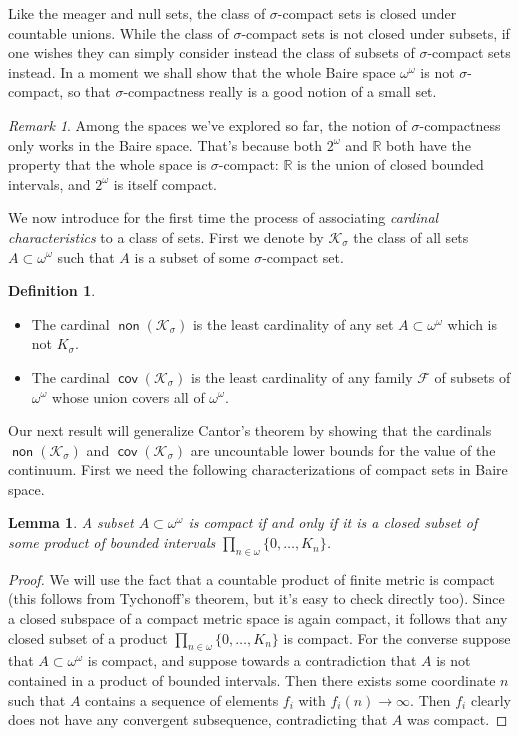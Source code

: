 \documentclass[11pt,oneside]{amsbook}
\newcommand{\RR}{\mathbb R}
\newcommand{\Ksigma}{\mathcal K_\sigma}
\DeclareMathOperator{\non}{\mathsf{non}}
\DeclareMathOperator{\cov}{\mathsf{cov}}
\theoremstyle{definition}
\theoremstyle{plain}
\newtheorem{lem}[thm]{Lemma}
\theoremstyle{definition}
\newtheorem{defn}[thm]{Definition}
\theoremstyle{remark}
\newtheorem{rem}[thm]{Remark}
\numberwithin{equation}{section}
\numberwithin{figure}{section}
\begin{document}
Like the meager and null sets, the class of $\sigma$-compact sets is closed under countable unions. While the class of $\sigma$-compact sets is not closed under subsets, if one wishes they can simply consider instead the class of subsets of $\sigma$-compact sets instead. In a moment we shall show that the whole Baire space $\omega^\omega$ is not $\sigma$-compact, so that $\sigma$-compactness really is a good notion of a small set.

\begin{rem}
  Among the spaces we've explored so far, the notion of $\sigma$-compactness only works in the Baire space. That's because both $2^\omega$ and $\RR$ both have the property that the whole space is $\sigma$-compact: $\RR$ is the union of closed bounded intervals, and $2^\omega$ is itself compact.
\end{rem}

We now introduce for the first time the process of associating \emph{cardinal characteristics} to a class of sets. First we denote by $\Ksigma$ the class of all sets $A\subset\omega^\omega$ such that $A$ is a subset of some $\sigma$-compact set.

\begin{defn}
  \begin{itemize}
  \item The cardinal $\non(\Ksigma)$ is the least cardinality of any set $A\subset\omega^\omega$ which is not $K_\sigma$.
  \item The cardinal $\cov(\Ksigma)$ is the least cardinality of any family $\mathcal F$ of subsets of $\omega^\omega$ whose union covers all of $\omega^\omega$.
  \end{itemize}
\end{defn}

Our next result will generalize Cantor's theorem by showing that the cardinals $\non(\Ksigma)$ and $\cov(\Ksigma)$ are uncountable lower bounds for the value of the continuum. First we need the following characterizations of compact sets in Baire space.

\begin{lem}
  \label{lem:baire-compact}
  A subset $A\subset\omega^\omega$ is compact if and only if it is a closed subset of some product of bounded intervals $\prod_{n\in\omega}\{0,\ldots,K_n\}$.
\end{lem}

\begin{proof}
  We will use the fact that a countable product of finite metric is compact (this follows from Tychonoff's theorem, but it's easy to check directly too). Since a closed subspace of a compact metric space is again compact, it follows that any closed subset of a product $\prod_{n\in\omega}\{0,\ldots,K_n\}$ is compact. For the converse suppose that $A\subset\omega^\omega$ is compact, and suppose towards a contradiction that $A$ is not contained in a product of bounded intervals. Then there exists some coordinate $n$ such that $A$ contains a sequence of elements $f_i$ with $f_i(n)\to\infty$. Then $f_i$ clearly does not have any convergent subsequence, contradicting that $A$ was compact.
\end{proof}
\end{document}
